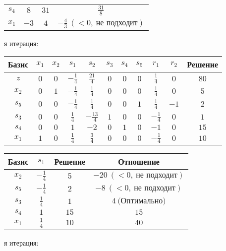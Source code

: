 \documentclass{article}%
\begin{document}
\begin{flushleft}
\begin{tabular}{|cccc|}
$s_{4}$&$8$&$31$&$\frac{31}{8}$\\%
$x_{1}$&$-3$&$4$&$-\frac{4}{3}\: (< 0, \: \text{не подходит})$\\%
\hline%
\end{tabular}%
\newline%
\newline%
я итерация: %
\newline%
\newline%
\renewcommand{\arraystretch}{1.3}%
\begin{tabular}{|c|ccccccccc|c|}%
\hline%
Базис&$x_{1}$&$x_{2}$&$s_{1}$&$s_{2}$&$s_{3}$&$s_{4}$&$s_{5}$&$r_{1}$&$r_{2}$&Решение\\%
\hline%
$z$&$0$&$0$&$-\frac{1}{4}$&$\frac{21}{4}$&$0$&$0$&$0$&$\frac{1}{4}$&$0$&$80$\\%
\hline%
$x_{2}$&$0$&$1$&$-\frac{1}{4}$&$\frac{1}{4}$&$0$&$0$&$0$&$\frac{1}{4}$&$0$&$5$\\%
$s_{5}$&$0$&$0$&$-\frac{1}{4}$&$\frac{1}{4}$&$0$&$0$&$1$&$\frac{1}{4}$&$-1$&$2$\\%
$s_{3}$&$0$&$0$&$\frac{1}{4}$&$-\frac{13}{4}$&$1$&$0$&$0$&$-\frac{1}{4}$&$0$&$1$\\%
$s_{4}$&$0$&$0$&$1$&$-2$&$0$&$1$&$0$&$-1$&$0$&$15$\\%
$x_{1}$&$1$&$0$&$\frac{1}{4}$&$\frac{3}{4}$&$0$&$0$&$0$&$-\frac{1}{4}$&$0$&$10$\\%
\hline%
\end{tabular}%
\newline%
\newline%
\newline%
\begin{tabular}{|cccc|}%
\hline%
Базис&$s_{1}$&Решение&Отношение\\%
\hline%
$x_{2}$&$-\frac{1}{4}$&$5$&$-20\: (< 0, \: \text{не подходит})$\\%
$s_{5}$&$-\frac{1}{4}$&$2$&$-8\: (< 0, \: \text{не подходит})$\\%
$s_{3}$&$\frac{1}{4}$&$1$&$4\: \text{(Оптимально)}$\\%
$s_{4}$&$1$&$15$&$15$\\%
$x_{1}$&$\frac{1}{4}$&$10$&$40$\\%
\hline%
\end{tabular}%
\newline%
\newline%
я итерация: %
\newline%
\newline%

\end{flushleft}
\end{document}
